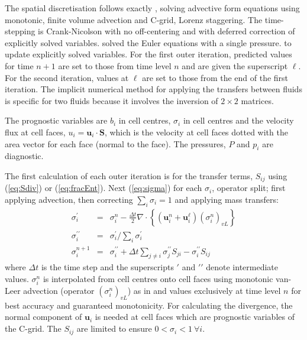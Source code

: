 \documentclass[draft]{agujournal2019}
\begin{document}
The spatial discretisation follows exactly , solving
advective form equations using monotonic, finite volume advection
and C-grid, Lorenz staggering. The time-stepping is Crank-Nicolson
with no off-centering and with deferred correction of explicitly solved
variables.  
{solved the Euler equations with a single pressure.}
 to update explicitly solved variables. For the first outer
iteration, predicted values for time $n+1$ are set to those from
time level $n$ and are given the superscript $\ell$. For the second
iteration, values at $\ell$ are set to those from the end of the
first iteration. The implicit numerical method for applying the transfers
between fluids is specific for two fluids because it involves the
inversion of $2\times2$ matrices. 

The prognostic variables are  $b_{i}$ in cell centres,  $\sigma_{i}$
in cell centres and the velocity flux at cell faces, $u_{i}=\mathbf{u}_{i}\cdot\mathbf{S}$,
which is the velocity at cell faces dotted with the area vector for
each face (normal to the face). The pressures, $P$ and $p_{i}$ are
diagnostic.

{The first calculation of each outer iteration is for the transfer terms, $S_{ij}$ using ({\protect\ref{eq:Sdiv}}) or ({\protect\ref{eq:fracEnt}}). Next}
(\ref{eq:sigma}) 
for each $\sigma_{i}$, operator split; first applying advection,
then correcting $\sum_{i}\sigma_{i}=1$ and  applying mass transfers:
\begin{eqnarray}
\sigma_{i}^{\prime} & = & \sigma_{i}^{n}-\frac{\Delta t}{2}\nabla\cdot\left\{ \left(\mathbf{u}_{i}^{n}+\mathbf{u}_{i}^{\ell}\right)\left(\sigma_{i}^{n}\right)_{vL}\right\}
\\
\sigma_{i}^{\prime\prime} & = & \sigma_{i}^{\prime}\bigg/\sum_{i}\sigma_{i}^{\prime}
\\
\sigma_{i}^{n+1} & = & \sigma_{i}^{\prime\prime}+\Delta t\sum_{j\ne i}\sigma_{j}^{\prime\prime}S_{ji}-\sigma_{i}^{\prime\prime}S_{ij}
\end{eqnarray}
where $\Delta t$ is the time step and the superscripts $\prime$
and $\prime\prime$ denote intermediate values. $\sigma_{i}^{n}$
is interpolated from cell centres onto cell faces using monotonic
van-Leer advection (operator $(\sigma_{i}^{n})_{vL}$) as in 
and values exclusively at time level $n$ for best accuracy and guaranteed
monotonicity. For calculating the divergence, the normal component
of $\mathbf{u}_{i}$ is needed at cell faces which are prognostic
variables of the C-grid. The $S_{ij}$ are limited to ensure $0<\sigma_{i}<1\ \forall i$. 
\end{document}
